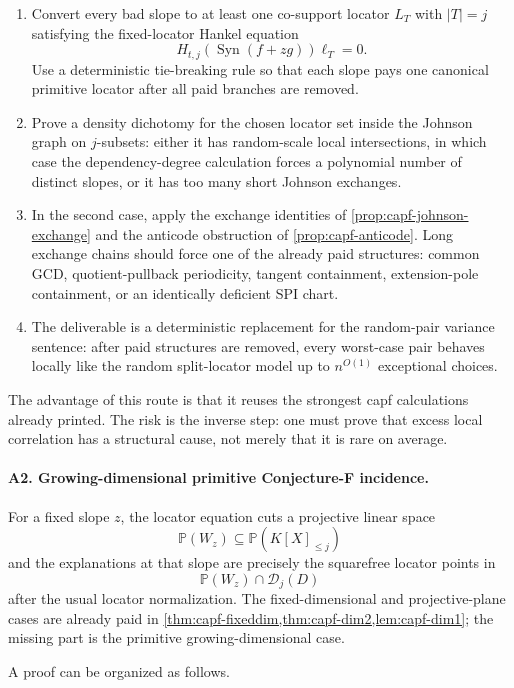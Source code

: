 \documentclass[11pt]{article}
\theoremstyle{definition}
\theoremstyle{remark}
\newcommand{\Syn}{\operatorname{Syn}}
\providecommand{\Dloc}{\mathcal D}
\providecommand{\PP}{\mathbb P}
\begin{document}
\begin{enumerate}[label=\textup{A1.\arabic*},leftmargin=3.0em]
\item Convert every bad slope to at least one co-support locator $L_T$ with $|T|=j$ satisfying the fixed-locator Hankel equation
\[
        H_{t,j}(\Syn(f+zg))\boldsymbol\ell_T=0 .
\]
Use a deterministic tie-breaking rule so that each slope pays one canonical primitive locator after all paid branches are removed.
\item Prove a density dichotomy for the chosen locator set inside the Johnson graph on $j$-subsets: either it has random-scale local intersections, in which case the dependency-degree calculation forces a polynomial number of distinct slopes, or it has too many short Johnson exchanges.
\item In the second case, apply the exchange identities of \cref{prop:capf-johnson-exchange} and the anticode obstruction of \cref{prop:capf-anticode}.  Long exchange chains should force one of the already paid structures: common GCD, quotient-pullback periodicity, tangent containment, extension-pole containment, or an identically deficient SPI chart.
\item The deliverable is a deterministic replacement for the random-pair variance sentence: after paid structures are removed, every worst-case pair behaves locally like the random split-locator model up to $n^{O(1)}$ exceptional choices.
\end{enumerate}

The advantage of this route is that it reuses the strongest capf calculations already printed.  The risk is the inverse step: one must prove that excess local correlation has a structural cause, not merely that it is rare on average.

\paragraph{A2. Growing-dimensional primitive Conjecture-F incidence.}
For a fixed slope $z$, the locator equation cuts a projective linear space
\[
        \PP(W_z)\subseteq \PP(K[X]_{\le j})
\]
and the explanations at that slope are precisely the squarefree locator points in
\[
        \PP(W_z)\cap \Dloc_j(D)
\]
after the usual locator normalization.  The fixed-dimensional and projective-plane cases are already paid in \cref{thm:capf-fixeddim,thm:capf-dim2,lem:capf-dim1}; the missing part is the primitive growing-dimensional case.

A proof can be organized as follows.
\end{document}

